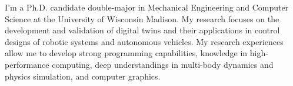 

\begin{cvparagraph}

I'm a Ph.D. candidate double-major in Mechanical Engineering and Computer Science at the University of Wisconsin Madison. My research focuses on the development and validation of digital twins and their applications in control designs of robotic systems and autonomous vehicles. My research experiences allow me to develop strong programming capabilities, knowledge in high-performance computing, deep understandings in multi-body dynamics and physics simulation, and computer graphics.
\end{cvparagraph}